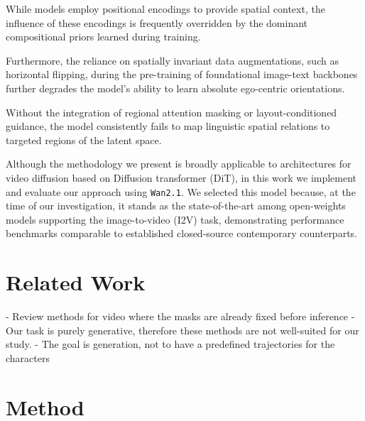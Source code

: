 \documentclass{article}
\begin{document}
While models employ positional encodings to provide spatial context, the influence of these encodings is frequently overridden by the dominant compositional priors learned during training.

Furthermore, the reliance on spatially invariant data augmentations, such as horizontal flipping, during the pre-training of foundational image-text backbones further degrades the model's ability to learn absolute ego-centric orientations.

Without the integration of regional attention masking or layout-conditioned guidance, the model consistently fails to map linguistic spatial relations to targeted regions of the latent space.


Although the methodology we present is broadly applicable to architectures for video diffusion based on Diffusion transformer (DiT), in this work we implement and evaluate our approach using \texttt{Wan2.1}. We selected this model because, at the time of our investigation, it stands as the state-of-the-art among open-weights models supporting the image-to-video (I2V) task, demonstrating performance benchmarks comparable to established closed-source contemporary counterparts.


\section{Related Work}

- Review methods for video where the masks are already fixed before inference
- Our task is purely generative, therefore these methods are not well-suited for our study.
- The goal is generation,  not to have a predefined trajectories for the characters


\section{Method}

\end{document}
